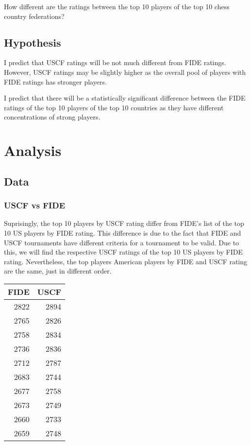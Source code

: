 \documentclass[12pt]{article}
\begin{document}
How different are the ratings between the top 10 players of the top 10 chess country federations?
\subsection{Hypothesis}
I predict that USCF ratings will be not much different from FIDE ratings. However, USCF ratings may be slightly higher as the overall pool of players with FIDE ratings has stronger players.

I predict that there will be a statistically significant difference between the FIDE ratings of the top 10 players of the top 10 countries as they have different concentrations of strong players. 

\section{Analysis}
\subsection{Data}
\subsubsection{USCF vs FIDE}
Suprisingly, the top 10 players by USCF rating differ from FIDE's list of the top 10 US players by FIDE rating. This difference is due to the fact that FIDE and USCF tournaments have different criteria for a tournament to be valid. Due to this, we will find the respective USCF ratings of the top 10 US players by FIDE rating. Nevertheless, the top players American players by FIDE and USCF rating are the same, just in different order.

\begin{center}
\begin{tabular}{rr}
FIDE & USCF\\
\hline
2822 & 2894\\
2765 & 2826\\
2758 & 2834\\
2736 & 2836\\
2712 & 2787\\
2683 & 2744\\
2677 & 2758\\
2673 & 2749\\
2660 & 2733\\
2659 & 2748\\
\end{tabular}
\end{center}
\end{document}
